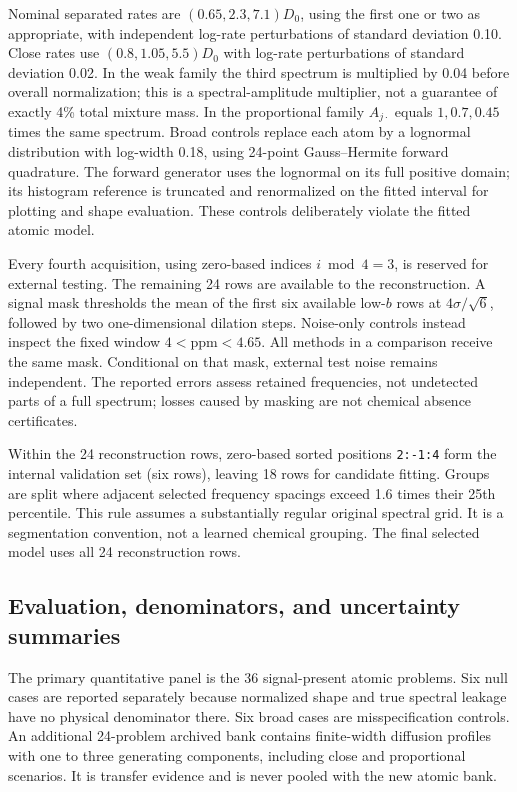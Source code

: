 Nominal separated rates are $(0.65,2.3,7.1)D_0$, using the first one or two as appropriate, with independent log-rate perturbations of standard deviation 0.10. Close rates use $(0.8,1.05,5.5)D_0$ with log-rate perturbations of standard deviation 0.02. In the weak family the third spectrum is multiplied by 0.04 before overall normalization; this is a spectral-amplitude multiplier, not a guarantee of exactly 4\% total mixture mass. In the proportional family $A_{j\cdot}$ equals $1,0.7,0.45$ times the same spectrum. Broad controls replace each atom by a lognormal distribution with log-width 0.18, using 24-point Gauss--Hermite forward quadrature. The forward generator uses the lognormal on its full positive domain; its histogram reference is truncated and renormalized on the fitted interval for plotting and shape evaluation. These controls deliberately violate the fitted atomic model.

Every fourth acquisition, using zero-based indices $i\bmod4=3$, is reserved for external testing. The remaining 24 rows are available to the reconstruction. A signal mask thresholds the mean of the first six available low-$b$ rows at $4\sigma/\sqrt6$, followed by two one-dimensional dilation steps. Noise-only controls instead inspect the fixed window $4<\mathrm{ppm}<4.65$. All methods in a comparison receive the same mask. Conditional on that mask, external test noise remains independent. The reported errors assess retained frequencies, not undetected parts of a full spectrum; losses caused by masking are not chemical absence certificates.

Within the 24 reconstruction rows, zero-based sorted positions \texttt{2:-1:4} form the internal validation set (six rows), leaving 18 rows for candidate fitting. Groups are split where adjacent selected frequency spacings exceed 1.6 times their 25th percentile. This rule assumes a substantially regular original spectral grid. It is a segmentation convention, not a learned chemical grouping. The final selected model uses all 24 reconstruction rows.

\subsection{Evaluation, denominators, and uncertainty summaries}
The primary quantitative panel is the 36 signal-present atomic problems. Six null cases are reported separately because normalized shape and true spectral leakage have no physical denominator there. Six broad cases are misspecification controls. An additional 24-problem archived bank contains finite-width diffusion profiles with one to three generating components, including close and proportional scenarios. It is transfer evidence and is never pooled with the new atomic bank.

